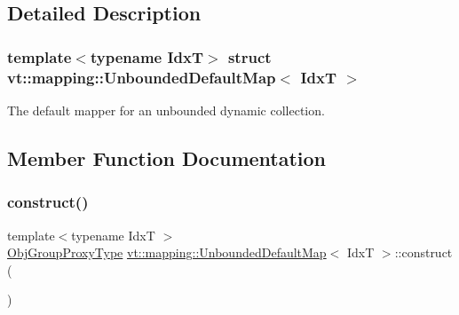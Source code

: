 \subsection{Detailed Description}
\subsubsection*{template$<$typename IdxT$>$\newline
struct vt\+::mapping\+::\+Unbounded\+Default\+Map$<$ Idx\+T $>$}

The default mapper for an unbounded dynamic collection. 

\subsection{Member Function Documentation}
\mbox{\label{structvt_1_1mapping_1_1_unbounded_default_map_aeb005e2e45f45fcd17548ee10e66862b}} 
\subsubsection{\texorpdfstring{construct()}{construct()}}
{\footnotesize\ttfamily template$<$typename IdxT $>$ \\
\hyperlink{namespacevt_ad7cae989df485fccca57f0792a880a8e}{Obj\+Group\+Proxy\+Type} \hyperlink{structvt_1_1mapping_1_1_unbounded_default_map}{vt\+::mapping\+::\+Unbounded\+Default\+Map}$<$ IdxT $>$\+::construct (\begin{DoxyParamCaption}{ }\end{DoxyParamCaption})\hspace{0.3cm}{\ttfamily [static]}}

\mbox{\label{structvt_1_1mapping_1_1_unbounded_default_map_a8617e6a789985a7140d09a8be6bc3a47}} 
